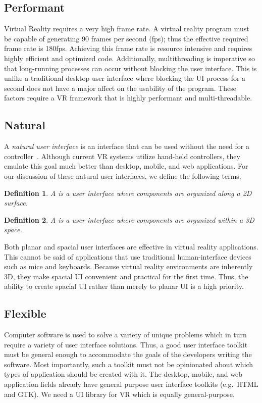 \documentclass[conference,12pt]{IEEEtran}
\newtheorem{definition}{Definition}
\begin{document}
\subsection{Performant}\label{sec:performant}
Virtual Reality requires a very high frame rate. A virtual reality program must
be capable of generating 90 frames per second (fps); thus the effective required
frame rate is 180fps.  Achieving this frame rate is resource intensive and
requires highly efficient and optimized code. Additionally, multithreading is
imperative so that long-running processes can occur without blocking the user
interface. This is unlike a traditional desktop user interface where blocking
the UI process for a second does not have a major affect on the usability of the
program. These factors require a VR framework that is highly performant and
multi-threadable.

\subsection{Natural}\label{sec:natural}
A \textit{natural user interface} is an interface that can be used without the
need for a controller~\cite{Wimmers:2015:VR:Natural-UI}. Although current VR
systems utilize hand-held controllers, they emulate this goal much better than
desktop, mobile, and web applications. For our discussion of these natural user
interfaces, we define the following terms.

\begin{definition}\label{def:planar-ui}
    A {\normalfont{}} is a user interface where components are
    organized along a 2D surface.
\end{definition}

\begin{definition}\label{def:spacial-ui}
    A {\normalfont{}} is a user interface where components are
    organized within a 3D space.
\end{definition}

Both planar and spacial user interfaces are effective in virtual reality
applications. This cannot be said of applications that use traditional
human-interface devices such as mice and keyboards. Because virtual reality
environments are inherently 3D, they make spacial UI convenient and practical
for the first time. Thus, the ability to create spacial UI rather than merely to
planar UI is a high priority.

\subsection{Flexible}\label{sec:flexible}
Computer software is used to solve a variety of unique problems which in turn
require a variety of user interface solutions. Thus, a good user interface
toolkit must be general enough to accommodate the goals of the developers
writing the software. Most importantly, such a toolkit must not be opinionated
about which types of application should be created with it. The desktop, mobile,
and web application fields already have general purpose user interface toolkits
(e.g.\ HTML and GTK). We need a UI library for VR which is equally
general-purpose.
\end{document}
